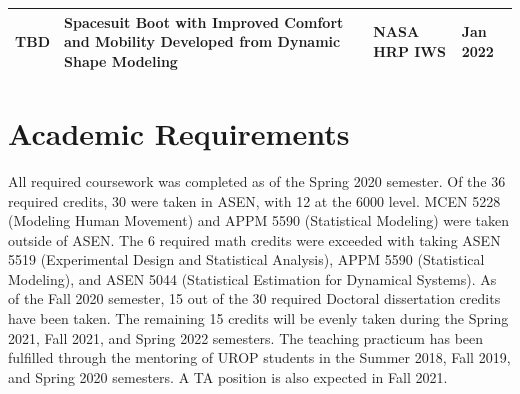 \documentclass[defaultstyle,11pt]{comps}
\begin{document}
\begin{longtable}[]{@{}llll@{}}
\begin{minipage}[t]{0.22\columnwidth}
TBD\strut
\end{minipage} & \begin{minipage}[t]{0.22\columnwidth}\raggedright
Spacesuit Boot with Improved Comfort and Mobility Developed from Dynamic Shape Modeling\strut
\end{minipage} & \begin{minipage}[t]{0.22\columnwidth}\raggedright
NASA HRP IWS\strut
\end{minipage} & \begin{minipage}[t]{0.22\columnwidth}\raggedright
Jan 2022\strut
\end{minipage}\tabularnewline
\bottomrule
\end{longtable}

\hypertarget{academic-requirements}{%
\section{Academic Requirements}\label{academic-requirements}}

All required coursework was completed as of the Spring 2020 semester. Of the 36 required credits, 30 were taken in ASEN, with 12 at the 6000 level. MCEN 5228 (Modeling Human Movement) and APPM 5590 (Statistical Modeling) were taken outside of ASEN. The 6 required math credits were exceeded with taking ASEN 5519 (Experimental Design and Statistical Analysis), APPM 5590 (Statistical Modeling), and ASEN 5044 (Statistical Estimation for Dynamical Systems). As of the Fall 2020 semester, 15 out of the 30 required Doctoral dissertation credits have been taken. The remaining 15 credits will be evenly taken during the Spring 2021, Fall 2021, and Spring 2022 semesters. The teaching practicum has been fulfilled through the mentoring of UROP students in the Summer 2018, Fall 2019, and Spring 2020 semesters. A TA position is also expected in Fall 2021.


\newpage


\usepackage{natbib}

\end{document}
